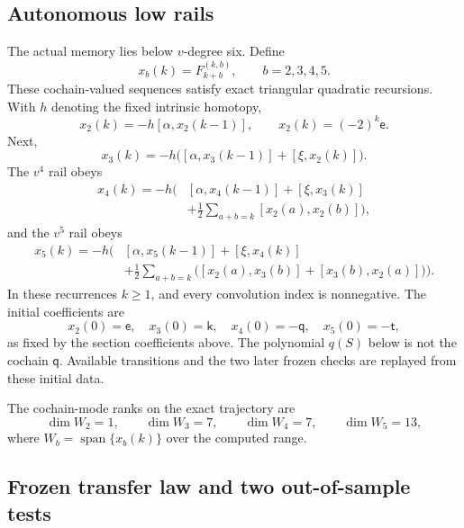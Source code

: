 \documentclass[11pt]{amsart}
\newcommand{\Span}{\operatorname{span}}
\begin{document}
\subsection{Autonomous low rails}

The actual memory lies below $v$-degree six.  Define
\begin{equation}\label{eq:low-rails}
\boxed{x_b(k)=F_{k+b}^{(k,b)},\qquad b=2,3,4,5.}
\end{equation}
These cochain-valued sequences satisfy exact triangular quadratic recursions.  With $h$ denoting the fixed intrinsic homotopy,
\begin{equation}\label{eq:x2-rec}
x_2(k)=-h[\alpha,x_2(k-1)],
\qquad
x_2(k)=(-2)^k\mathsf e.
\end{equation}
Next,
\begin{equation}\label{eq:x3-rec}
x_3(k)=-h\bigl([\alpha,x_3(k-1)]+[\xi,x_2(k)]\bigr).
\end{equation}
The $v^4$ rail obeys
\begin{equation}\label{eq:x4-rec}
\begin{aligned}
x_4(k)=-h\Bigg(&[\alpha,x_4(k-1)]+[\xi,x_3(k)]\\
&+\frac12\sum_{a+b=k}[x_2(a),x_2(b)]\Bigg),
\end{aligned}
\end{equation}
and the $v^5$ rail obeys
\begin{equation}\label{eq:x5-rec}
\begin{aligned}
x_5(k)=-h\Bigg(&[\alpha,x_5(k-1)]+[\xi,x_4(k)]\\
&+\frac12\sum_{a+b=k}
\bigl([x_2(a),x_3(b)]+[x_3(b),x_2(a)]\bigr)\Bigg).
\end{aligned}
\end{equation}
In these recurrences $k\ge1$, and every convolution index is nonnegative.
The initial coefficients are
\[
x_2(0)=\mathsf e,\quad x_3(0)=\mathsf k,\quad
x_4(0)=-\mathsf q,\quad x_5(0)=-\mathsf t,
\]
as fixed by the section coefficients above. The polynomial $q(S)$ below is
not the cochain $\mathsf q$. Available transitions and the two later frozen
checks are replayed from these initial data.

The cochain-mode ranks on the exact trajectory are
\begin{equation}\label{eq:rail-ranks}
\boxed{
\dim W_2=1,
\qquad
\dim W_3=7,
\qquad
\dim W_4=7,
\qquad
\dim W_5=13,
}
\end{equation}
where $W_b=\Span\{x_b(k)\}$ over the computed range.

\subsection{Frozen transfer law and two out-of-sample tests}
\end{document}
